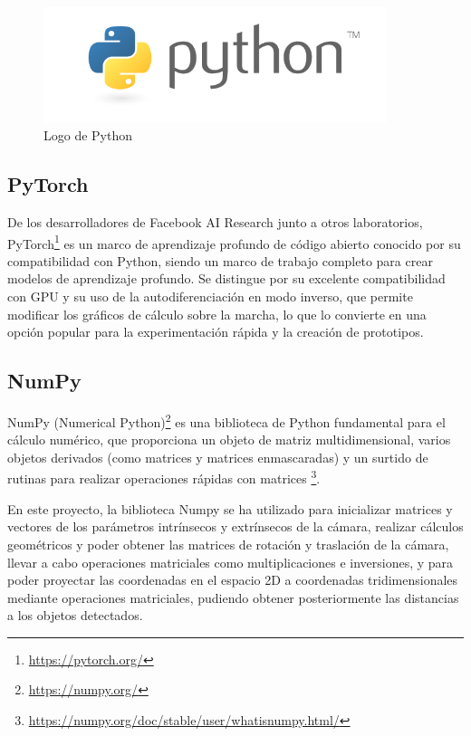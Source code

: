 \begin{figure} [H]
    \begin{center}
      \includegraphics[width=10cm]{figs/python logo.png}
    \end{center}
    \caption{Logo de Python}
    \label{fig:Python_Logo}
\end{figure}

\subsection{PyTorch}
\label{sec:PyTorch}

De los desarrolladores de Facebook AI Research junto a otros laboratorios, PyTorch\footnote{\url{https://pytorch.org/}} es un marco de aprendizaje profundo de código abierto conocido por su compatibilidad con Python, siendo un marco de trabajo completo para crear modelos de aprendizaje profundo. Se distingue por su excelente compatibilidad con GPU y su uso de la autodiferenciación en modo inverso, que permite modificar los gráficos de cálculo sobre la marcha, lo que lo convierte en una opción popular para la experimentación rápida y la creación de prototipos.

\subsection{NumPy}
\label{sec:NumPy}

NumPy (Numerical Python)\footnote{\url{https://numpy.org/}} es una biblioteca de Python fundamental para el cálculo numérico, que proporciona un objeto de matriz multidimensional, varios objetos derivados (como matrices y matrices enmascaradas) y un surtido de rutinas para realizar operaciones rápidas con matrices \footnote{\url{https://numpy.org/doc/stable/user/whatisnumpy.html/}}. 

En este proyecto, la biblioteca Numpy se ha utilizado para inicializar matrices y vectores de los parámetros intrínsecos y extrínsecos de la cámara, realizar cálculos geométricos y poder obtener las matrices de rotación y traslación de la cámara, llevar a cabo operaciones matriciales como multiplicaciones e inversiones, y para poder proyectar las coordenadas en el espacio 2D a coordenadas tridimensionales mediante operaciones matriciales, pudiendo obtener posteriormente las distancias a los objetos detectados. 

